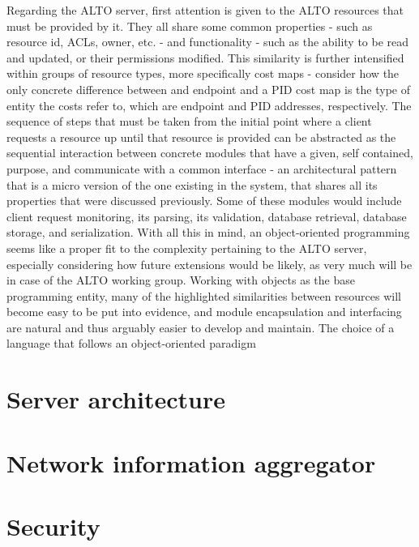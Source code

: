     Regarding the ALTO server, first attention is given to the ALTO resources that must be provided by it.
    They all share some common properties - such as resource id, ACLs, owner, etc. - and functionality - such as the ability to be read and updated, or their permissions modified.
    This similarity is further intensified within groups of resource types, more specifically cost maps - consider how the only concrete difference between and endpoint and a PID cost map is the type of entity the costs refer to, which are endpoint and PID addresses, respectively.
    The sequence of steps that must be taken from the initial point where a client requests a resource up until that resource is provided can be abstracted as the sequential interaction between concrete modules that have a given, self contained, purpose, and communicate with a common interface - an architectural pattern that is a micro version of the one existing in the system, that shares all its properties that were discussed previously.
    Some of these modules would include client request monitoring, its parsing, its validation, database retrieval, database storage, and serialization.
    With all this in mind, an object-oriented programming seems like a proper fit to the complexity pertaining to the ALTO server, especially considering how future extensions would be likely, as very much will be in case of the ALTO working group.
    Working with objects as the base programming entity, many of the highlighted similarities between resources will become easy to be put into evidence, and module encapsulation and interfacing are natural and thus arguably easier to develop and maintain.
    The choice of a language that follows an object-oriented paradigm


\section{Server architecture}


\section{Network information aggregator}

\section{Security}

